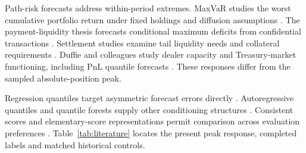 \documentclass[11pt,a4paper]{article}
\begin{document}
Path-risk forecasts address within-period extremes. MaxVaR studies the worst cumulative portfolio return under fixed holdings and diffusion assumptions \citep{boudoukh2004}. The payment-liquidity thesis forecasts conditional maximum deficits from confidential transactions \citep{hoogen2017}. Settlement studies examine tail liquidity needs and collateral requirements \citep{petrunia2019,arjani2020}. Duffie and colleagues study dealer capacity and Treasury-market functioning, including PnL quantile forecasts \citep{duffie2023}. These responses differ from the sampled absolute-position peak.


Regression quantiles target asymmetric forecast errors directly \citep{koenker1978}. Autoregressive quantiles and quantile forests supply other conditioning structures \citep{engle2004,meinshausen2006}. Consistent scores and elementary-score representations permit comparison across evaluation preferences \citep{gneiting2011,ehm2016}. Table~\ref{tab:literature} locates the present peak response, completed labels and matched historical controls.
\end{document}
